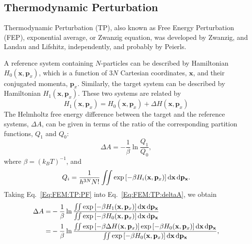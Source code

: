 \subsection{Thermodynamic Perturbation\label{Sec:FEM:TP}}
Thermodynamic Perturbation (TP), also known as Free Energy Perturbation (FEP), exponential average, or Zwanzig equation, was developed by Zwanzig,\cite{ZwanzigJCP1954} and Landau and Lifshitz, independently, and probably by Peierls\cite{JorgensenJCTC2008}. 

A reference system containing $N$-particles can be described by Hamiltonian $H_{0}(\mathbf{x},\mathbf{p}_{x})$, which is a function of $3N$ Cartesian coordinates, $\mathbf{x}$, and their conjugated momenta, $\mathbf{p}_{x}$. Similarly, the target system can be described by Hamiltonian $H_{1}(\mathbf{x},\mathbf{p}_{x})$. These two systems are related by 
\begin{equation}
  H_{1}(\mathbf{x},\mathbf{p}_{x}) = H_{0}(\mathbf{x},\mathbf{p}_{x}) + \Delta H (\mathbf{x},\mathbf{p}_{x})
  \label{Eq:FEM:TP:deltaH}
\end{equation}
The Helmholtz free energy difference between the target and the reference systems, $\Delta A$, can be given in terms of the ratio of the corresponding partition functions, $Q_{1}$ and $Q_{0}$:
\begin{equation}
  \Delta A  =  -\frac{1}{\beta}\ln\frac{Q_{1}}{Q_{0}},
  \label{Eq:FEM:TP:deltaA}
\end{equation}
where $\beta = {(k_{B}T)}^{-1}$, and
\begin{equation}
  Q_i = \frac{1}{{h}^{3N}N!} \iint \exp\left[-\beta H_i(\mathbf{x},\mathbf{p}_{x})\right] \mathop{}\!\mathrm{d}\mathbf{x}\mathop{}\!\mathrm{d} \mathbf{p}_\mathbf{x}.
  \label{Eq:FEM:TP:PF}
\end{equation}
Taking Eq.~\ref{Eq:FEM:TP:PF} into Eq.~\ref{Eq:FEM:TP:deltaA}, we obtain
\begin{align}
  \Delta A  =&  -\frac{1}{\beta}\ln{\frac{\iint \exp\left[-\beta H_{1}(\mathbf{x},\mathbf{p}_{x})\right] \diff\mathbf{x}\diff\mathbf{p}_\mathbf{x}}{\iint \exp\left[-\beta H_{0}(\mathbf{x},\mathbf{p}_{x}) \right] \diff\mathbf{x}\diff\mathbf{p}_\mathbf{x}}}\\
            =& -\frac{1}{\beta}\ln{\frac{\iint \exp\left[-\beta \Delta H(\mathbf{x},\mathbf{p}_{x})\right] \exp\left[-\beta H_{0}(\mathbf{x},\mathbf{p}_{x})\right] \diff\mathbf{x}\diff\mathbf{p}_\mathbf{x}}{\iint \exp\left[-\beta H_{0}(\mathbf{x},\mathbf{p}_{x})\right] \diff\mathbf{x}\diff\mathbf{p}_\mathbf{x}}},
  \label{Eq:FEM:TP:deltaA2}
\end{align}
